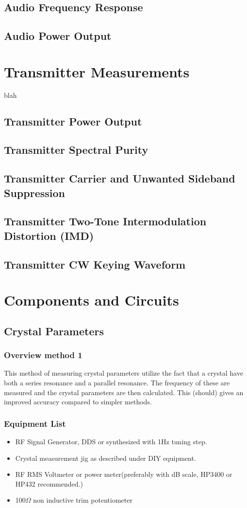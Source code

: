 \documentclass[10pt,letterpaper]{book}
\begin{document}
\section{Audio Frequency Response}
\section{Audio Power Output}
\chapter{Transmitter Measurements}
blah
\section{Transmitter Power Output}
\section{Transmitter Spectral Purity}
\section{Transmitter Carrier and Unwanted Sideband Suppression}
\section{Transmitter Two-Tone Intermodulation Distortion (IMD)}
\section{Transmitter CW Keying Waveform}
\chapter{Components and Circuits}

\section{Crystal Parameters}

\subsection*{Overview method 1}
This method of measuring crystal parameters utilize the fact that a crystal have both a series resonance and a parallel resonance. The frequency of these are measured and the crystal parameters are then calculated. This (should) gives an improved accuracy compared to simpler methods. 
\subsection*{Equipment List}
\begin{itemize}
	\item RF Signal Generator, DDS or synthesized with 1Hz tuning step.
	\item Crystal measurement jig as described under DIY equipment.
	\item RF RMS Voltmeter or power meter(preferably with dB scale, HP3400 or HP432 recommended.) 
	\item 100$\Omega$ non inductive trim potentiometer
\end{itemize}
\end{document}
